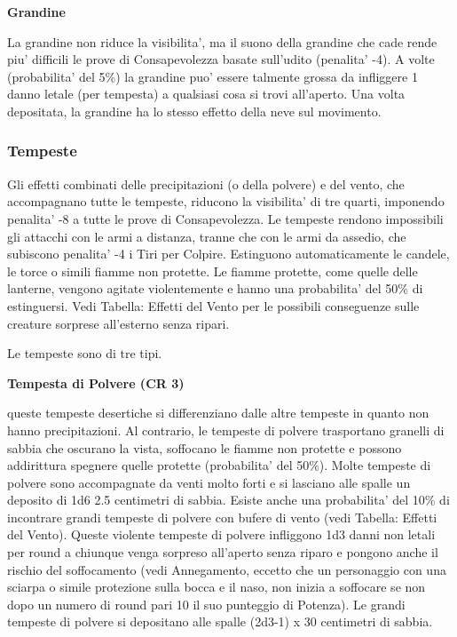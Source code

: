 \documentclass[a4paper,11pt,twoside,openany]{dndbook}
\begin{document}
{\textbf{Grandine}

La grandine non riduce la visibilita', ma il suono della grandine che cade rende piu' difficili le prove di Consapevolezza basate sull'udito (penalita' -4). A volte (probabilita' del 5\%) la grandine puo' essere talmente grossa da infliggere 1 danno letale (per tempesta) a qualsiasi cosa si trovi all'aperto. Una volta depositata, la grandine ha lo stesso effetto della neve sul movimento.

\subsubsection{Tempeste}

\label{tempeste}

Gli effetti combinati delle precipitazioni (o della polvere) e del vento, che accompagnano tutte le tempeste, riducono la visibilita' di tre quarti, imponendo penalita' -8 a tutte le prove di Consapevolezza. Le tempeste rendono impossibili gli attacchi con le armi a distanza, tranne che con le armi da assedio, che subiscono penalita' -4 i Tiri per Colpire.
Estinguono automaticamente le candele, le torce o simili fiamme non protette. Le fiamme protette, come quelle delle lanterne, vengono agitate violentemente e hanno una probabilita' del 50\% di estinguersi. Vedi Tabella: Effetti del Vento per le possibili conseguenze sulle creature sorprese all'esterno senza ripari. 

Le tempeste sono di tre tipi.

\textbf{Tempesta di Polvere (CR 3)}

queste tempeste desertiche si differenziano dalle altre tempeste in quanto non hanno precipitazioni. Al contrario, le tempeste di polvere trasportano granelli di sabbia che oscurano la vista, soffocano le fiamme non protette e possono addirittura spegnere quelle protette (probabilita' del 50\%). Molte tempeste di polvere sono accompagnate da venti molto forti e si lasciano alle spalle un deposito di 1d6 \texttimes{} 2.5 centimetri di sabbia.
Esiste anche una probabilita' del 10\% di incontrare grandi tempeste di polvere con bufere di vento (vedi Tabella: Effetti del Vento). Queste violente tempeste di polvere infliggono 1d3 danni non letali per round a chiunque venga sorpreso all'aperto senza riparo e pongono anche il rischio del soffocamento (vedi Annegamento, eccetto che un personaggio con una sciarpa o simile protezione sulla bocca e il naso, non inizia a soffocare se non dopo un numero di round pari 10 \texttimes{} il suo punteggio di Potenza). Le grandi tempeste di polvere si depositano alle spalle (2d3-1) x 30 centimetri di sabbia.

}
\end{document}

